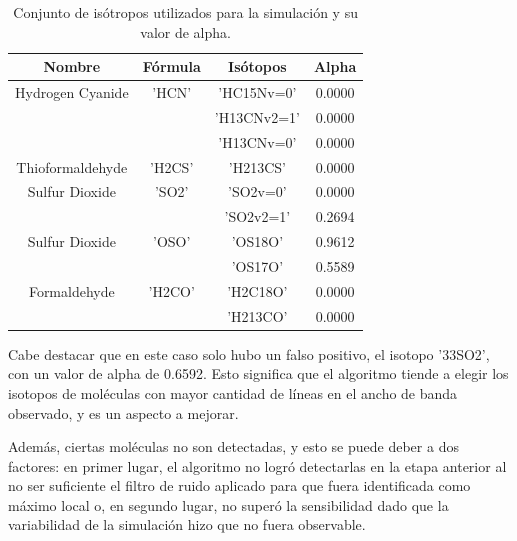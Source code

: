 \begin {table}[H]
\begin{center}
	\begin{tabular}{|c|c|c|c|}
		\hline Nombre & Fórmula &  Isótopos & Alpha \\ 
		
		
		\hline	Hydrogen Cyanide & 'HCN'  & 'HC15Nv=0' & 0.0000\\
								 &		  & 'H13CNv2=1' & 0.0000\\
								 &		  & 'H13CNv=0' & 0.0000\\ 
								
		
		\hline	Thioformaldehyde & 'H2CS' & 'H213CS' & 0.0000\\
		
		\hline	Sulfur Dioxide & 'SO2'	  & 'SO2v=0' & 0.0000\\
								&		  & 'SO2v2=1'& 0.2694 \\
		
		\hline	Sulfur Dioxide & 'OSO' & 'OS18O' & 0.9612\\
							   &	   & 'OS17O' & 0.5589\\
		
		\hline	Formaldehyde & 'H2CO'  & 'H2C18O' & 0.0000\\
							 &		   & 'H213CO' & 0.0000\\
		
		\hline 
	\end{tabular}
	\caption {Conjunto de isótropos utilizados para la simulación y su valor de alpha.}
\end{center}
\end{table}

Cabe destacar que en este caso solo hubo un falso positivo, el isotopo '33SO2', con un valor de alpha de 0.6592. Esto significa que el algoritmo tiende a elegir los isotopos de moléculas con mayor cantidad de líneas en el ancho de banda observado, y es un aspecto a mejorar. 

Además, ciertas moléculas no son detectadas, y esto se puede deber a dos factores: en primer lugar, el algoritmo no logró detectarlas en la etapa anterior al no ser suficiente el filtro de ruido aplicado para que fuera identificada como máximo local o, en segundo lugar, no superó la sensibilidad dado que la variabilidad de la simulación hizo que no fuera observable. 


